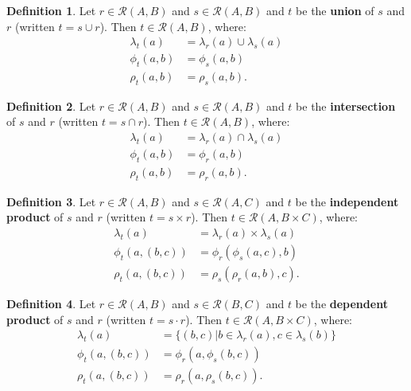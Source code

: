 \documentclass{article}
\theoremstyle{definition}
\newtheorem{definition}{Definition}[subsection]
\theoremstyle{plain}
\def\rule{\mathcal{R}}
\begin{document}
\begin{definition}
  Let $ r \in \rule (A, B) $
  and $ s \in \rule (A, B) $
  and $ t $ be the \textbf{union} of $ s $ and $ r $ (written $ t = s \cup r $).
  Then $ t \in \rule (A, B) $, where:
  \begin{align}
    \lambda_t (a)    & = \lambda_r (a) \cup \lambda_s (a) \\
       \phi_t (a, b) & =    \phi_s (a, b) \\
       \rho_t (a, b) & =    \rho_s (a, b).
  \end{align}
\end{definition}

\begin{definition}
  Let $ r \in \rule (A, B) $
  and $ s \in \rule (A, B) $
  and $ t $ be the \textbf{intersection} of $ s $ and $ r $ (written $ t = s \cap r $).
  Then $ t \in \rule (A, B) $, where:
  \begin{align}
    \lambda_t (a)    & = \lambda_r (a) \cap \lambda_s (a) \\
       \phi_t (a, b) & = \phi_r (a, b) \\
       \rho_t (a, b) & = \rho_r (a, b).
  \end{align}
\end{definition}

\begin{definition}
  Let $ r \in \rule (A, B) $
  and $ s \in \rule (A, C) $
  and $ t $ be the \textbf{independent product} of $ s $ and $ r $ (written $ t = s \times r $).
  Then $ t \in \rule (A, B \times C) $, where:
  \begin{align}
    \lambda_t (a)         & = \lambda_r (a) \times \lambda_s (a) \\
       \phi_t (a, (b, c)) & =    \phi_r (\phi_s (a, c), b) \\
       \rho_t (a, (b, c)) & =    \rho_s (\rho_r (a, b), c).
  \end{align}
\end{definition}

\begin{definition}
  Let $ r \in \rule (A, B) $
  and $ s \in \rule (B, C) $
  and $ t $ be the \textbf{dependent product} of $ s $ and $ r $ (written $ t = s \cdot r $).
  Then $ t \in \rule (A, B \times C) $, where:
  \begin{align}
    \lambda_t (a)         & = \{ (b, c) | b \in \lambda_r (a), c \in \lambda_s (b) \} \\
       \phi_t (a, (b, c)) & =    \phi_r (a, \phi_s (b, c)) \\
       \rho_t (a, (b, c)) & =    \rho_r (a, \rho_s (b, c)).
  \end{align}
\end{definition}
\end{document}

